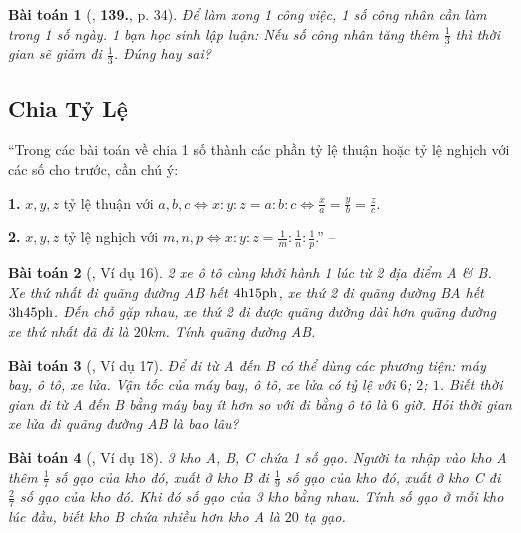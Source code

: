 \documentclass{article}
\numberwithin{equation}{section}
\newtheorem{baitoan}{Bài toán}
\begin{document}
\begin{baitoan}[\cite{Tuyen_Toan_7}, \textbf{139.}, p. 34]
	Để làm xong 1 công việc, 1 số công nhân cần làm trong 1 số ngày. 1 bạn học sinh lập luận: Nếu số công nhân tăng thêm $\frac{1}{3}$ thì thời gian sẽ giảm đi $\frac{1}{3}$. Đúng hay sai?
\end{baitoan}


\subsection{Chia Tỷ Lệ}
``Trong các bài toán về chia 1 số thành các phần tỷ lệ thuận hoặc tỷ lệ nghịch với các số cho trước, cần chú ý:
\begin{enumerate*}
	\item[\textbf{1.}] $x,y,z$ tỷ lệ thuận với $a,b,c\Leftrightarrow x:y:z = a:b:c\Leftrightarrow\frac{x}{a} = \frac{y}{b} = \frac{z}{c}$.
	\item[\textbf{2.}] $x,y,z$ tỷ lệ nghịch với $m,n,p\Leftrightarrow x:y:z = \frac{1}{m}:\frac{1}{n}:\frac{1}{p}$.'' -- \cite{Binh_Toan_7_tap_1}
\end{enumerate*}

\begin{baitoan}[\cite{Binh_Toan_7_tap_1}, Ví dụ 16]
	2 xe ô tô cùng khởi hành 1 lúc từ 2 địa điểm A \& B. Xe thứ nhất đi quãng đường AB hết $\rm4h15ph$, xe thứ 2 đi quãng đường BA hết $\rm3h45ph$. Đến chỗ gặp nhau, xe thứ 2 đi được quãng đường dài hơn quãng đường xe thứ nhất đã đi là $20$\emph{km}. Tính quãng đường AB.
\end{baitoan}

\begin{baitoan}[\cite{Binh_Toan_7_tap_1}, Ví dụ 17]
	Để đi từ A đến B có thể dùng các phương tiện: máy bay, ô tô, xe lửa. Vận tốc của máy bay, ô tô, xe lửa có tỷ lệ với $6$; $2$; $1$. Biết thời gian đi từ A đến B bằng máy bay ít hơn so với đi bằng ô tô là $6$ giờ. Hỏi thời gian xe lửa đi quãng đường AB là bao lâu?
\end{baitoan}

\begin{baitoan}[\cite{Binh_Toan_7_tap_1}, Ví dụ 18]
	3 kho A, B, C chứa 1 số gạo. Người ta nhập vào kho A thêm $\frac{1}{7}$ số gạo của kho đó, xuất ở kho B đi $\frac{1}{9}$ số gạo của kho đó, xuất ở kho C đi $\frac{2}{7}$ số gạo của kho đó. Khi đó số gạo của 3 kho bằng nhau. Tính số gạo ở mỗi kho lúc đầu, biết kho B chứa nhiều hơn kho A là $20$ tạ gạo.
\end{baitoan}
\end{document}
